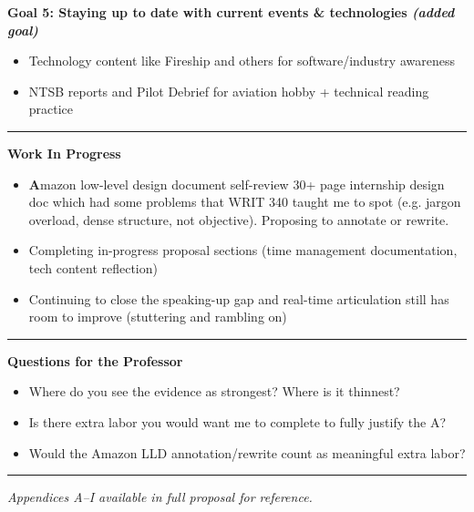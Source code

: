 \documentclass[10pt]{article}
\begin{document}
\begin{small}
\vspace{2pt}
\textbf{Goal 5: Staying up to date with current events \& technologies \textit{(added goal)}}
\begin{itemize}
  \item Technology content like Fireship and others for software/industry awareness
  \item NTSB reports and Pilot Debrief for aviation hobby + technical reading practice
\end{itemize}

\end{small}

\vspace{5pt}\hrule\vspace{5pt}

\textbf{Work In Progress}

\begin{small}
\begin{itemize}
  \item \textbf Amazon low-level design document self-review 30+ page internship design doc which had some problems that WRIT 340 taught me to spot (e.g. jargon overload, dense structure, not objective). Proposing to annotate or rewrite.
  \item Completing in-progress proposal sections (time management documentation, tech content reflection)
  \item Continuing to close the speaking-up gap and real-time articulation still has room to improve (stuttering and rambling on)
\end{itemize}
\end{small}

\vspace{5pt}\hrule\vspace{5pt}

\textbf{Questions for the Professor}

\begin{small}
\begin{itemize}
  \item Where do you see the evidence as strongest? Where is it thinnest?
  \item Is there extra labor you would want me to complete to fully justify the A?
  \item Would the Amazon LLD annotation/rewrite count as meaningful extra labor?
\end{itemize}
\end{small}

\vspace{5pt}\hrule\vspace{3pt}
\begin{center}
  \small\textit{Appendices A--I available in full proposal for reference.}
\end{center}
\end{document}
